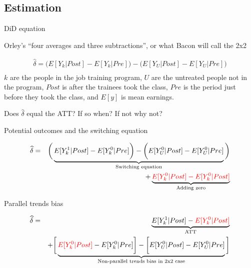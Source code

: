 \documentclass{beamer}
\begin{document}
\subsection{Estimation}


\begin{frame}{DiD equation}

Orley's ``four averages and three subtractions'', or what Bacon will call the 2x2

\begin{eqnarray*}
\widehat{\delta} = \bigg ( E[Y_k|Post] - E[Y_k|Pre] \bigg ) - \bigg ( E[Y_U | Post ] - E[ Y_U | Pre] \bigg) \\
\end{eqnarray*}$k$ are the people in the job training program, $U$ are the untreated people not in the program, $Post$ is after the trainees took the class, $Pre$ is the period just before they took the class, and $E[y]$ is mean earnings. 

\bigskip

Does $\widehat{\delta}$ equal the ATT?  If so when? If not why not?

\end{frame}



\begin{frame}{Potential outcomes and the switching equation}

\begin{eqnarray*}
\widehat{\delta} &=& \bigg ( \underbrace{E[Y^1_k|Post] - E[Y^0_k|Pre] \bigg ) - \bigg ( E[Y^0_U | Post ] - E[ Y^0_U | Pre]}_{\mathclap{\text{Switching equation}}} \bigg)  \\
&&+ \underbrace{\textcolor{red}{E[Y_k^0 |Post] - E[Y^0_k | Post]}}_{\mathclap{\text{Adding zero}}} 
\end{eqnarray*}

\end{frame}

\begin{frame}{Parallel trends bias}

\begin{eqnarray*}
\widehat{\delta} &=& \underbrace{E[Y^1_k | Post] - \textcolor{red}{E[Y^0_k | Post]}}_{\mathclap{\text{ATT}}} \\
&& + \bigg [  \underbrace{\textcolor{red}{E[Y^0_k | Post]} - E[Y^0_k | Pre] \bigg ] - \bigg [ E[Y^0_U | Post] - E[Y_U^0 | Pre] }_{\mathclap{\text{Non-parallel trends bias in 2x2 case}}} \bigg ]
\end{eqnarray*}


\end{frame}
\end{document}
